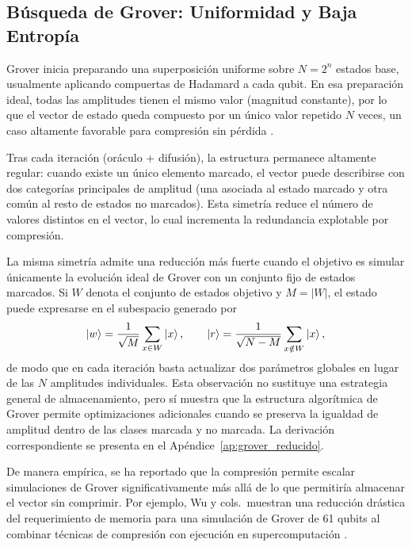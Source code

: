\subsection{Búsqueda de Grover: Uniformidad y Baja Entropía}
\label{subsec:patrones_grover}

Grover inicia preparando una superposición uniforme sobre $N=2^n$ estados base, usualmente aplicando compuertas de Hadamard a cada qubit. En esa preparación ideal, todas las amplitudes tienen el mismo valor (magnitud constante), por lo que el vector de estado queda compuesto por un único valor repetido $N$ veces, un caso altamente favorable para compresión sin pérdida \parencite{Grover1996, Szablowski2021}.

Tras cada iteración (oráculo + difusión), la estructura permanece altamente regular: cuando existe un único elemento marcado, el vector puede describirse con dos categorías principales de amplitud (una asociada al estado marcado y otra común al resto de estados no marcados). Esta simetría reduce el número de valores distintos en el vector, lo cual incrementa la redundancia explotable por compresión.

La misma simetría admite una reducción más fuerte cuando el objetivo es simular únicamente la evolución ideal de Grover con un conjunto fijo de estados marcados. Si $W$ denota el conjunto de estados objetivo y $M=|W|$, el estado puede expresarse en el subespacio generado por
\[
\ket{w}=\frac{1}{\sqrt{M}}\sum_{x\in W}\ket{x},
\qquad
\ket{r}=\frac{1}{\sqrt{N-M}}\sum_{x\notin W}\ket{x},
\]
de modo que en cada iteración basta actualizar dos parámetros globales en lugar de las $N$ amplitudes individuales. Esta observación no sustituye una estrategia general de almacenamiento, pero sí muestra que la estructura algorítmica de Grover permite optimizaciones adicionales cuando se preserva la igualdad de amplitud dentro de las clases marcada y no marcada. La derivación correspondiente se presenta en el Apéndice~\ref{ap:grover_reducido}.

De manera empírica, se ha reportado que la compresión permite escalar simulaciones de Grover significativamente más allá de lo que permitiría almacenar el vector sin comprimir. Por ejemplo, Wu y cols.\ muestran una reducción drástica del requerimiento de memoria para una simulación de Grover de 61 qubits al combinar técnicas de compresión con ejecución en supercomputación \parencite{wu2019full}.

